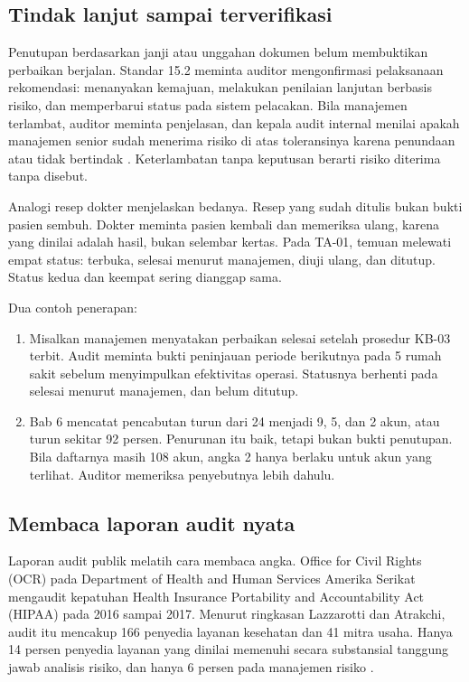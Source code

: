 \subsection*{Tindak lanjut sampai terverifikasi}

Penutupan berdasarkan janji atau unggahan dokumen belum membuktikan perbaikan berjalan. Standar 15.2
meminta auditor mengonfirmasi pelaksanaan rekomendasi: menanyakan kemajuan, melakukan penilaian
lanjutan berbasis risiko, dan memperbarui status pada sistem pelacakan. Bila manajemen terlambat,
auditor meminta penjelasan, dan kepala audit internal menilai apakah manajemen senior sudah menerima
risiko di atas toleransinya karena penundaan atau tidak bertindak \cite{iia-gias2024}. Keterlambatan
tanpa keputusan berarti risiko diterima tanpa disebut.

Analogi resep dokter menjelaskan bedanya. Resep yang sudah ditulis bukan bukti pasien sembuh. Dokter
meminta pasien kembali dan memeriksa ulang, karena yang dinilai adalah hasil, bukan selembar kertas.
Pada TA-01, temuan melewati empat status: terbuka, selesai menurut manajemen, diuji ulang, dan
ditutup. Status kedua dan keempat sering dianggap sama.

Dua contoh penerapan:
\begin{enumerate}
  \item Misalkan manajemen menyatakan perbaikan selesai setelah prosedur KB-03 terbit. Audit meminta
  bukti peninjauan periode berikutnya pada 5 rumah sakit sebelum menyimpulkan efektivitas operasi.
  Statusnya berhenti pada selesai menurut manajemen, dan belum ditutup.
  \item Bab 6 mencatat pencabutan turun dari 24 menjadi 9, 5, dan 2 akun, atau turun sekitar 92
  persen. Penurunan itu baik, tetapi bukan bukti penutupan. Bila daftarnya masih 108 akun, angka 2
  hanya berlaku untuk akun yang terlihat. Auditor memeriksa penyebutnya lebih dahulu.
\end{enumerate}

\subsection*{Membaca laporan audit nyata}

Laporan audit publik melatih cara membaca angka. Office for Civil Rights (OCR) pada Department of
Health and Human Services Amerika Serikat mengaudit kepatuhan Health Insurance Portability and
Accountability Act (HIPAA) pada 2016 sampai 2017. Menurut ringkasan Lazzarotti dan Atrakchi, audit
itu mencakup 166 penyedia layanan kesehatan dan 41 mitra usaha. Hanya 14 persen penyedia layanan
yang dinilai memenuhi secara substansial tanggung jawab analisis risiko, dan hanya 6 persen pada
manajemen risiko \cite{c12-lazzarotti2021}.

